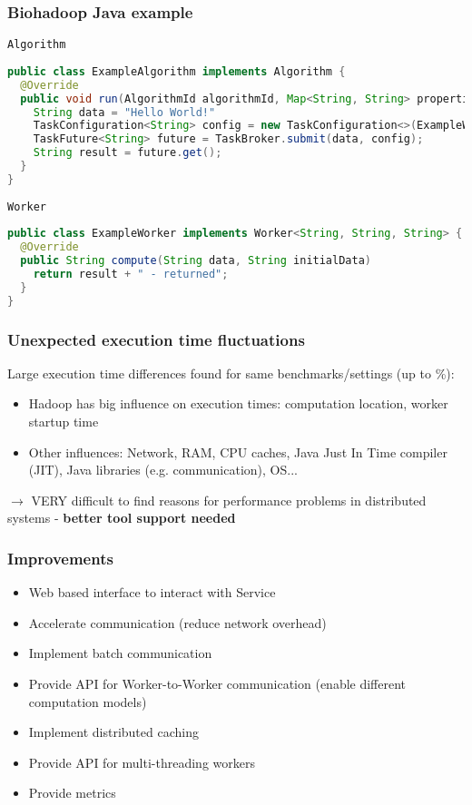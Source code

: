 \begin{frame}[fragile]
  \frametitle{Biohadoop Java example}
  \texttt{Algorithm}
  \begin{lstlisting}[language=java,basicstyle=\tiny\ttfamily,breaklines=true,keywordstyle=\color{blue},stringstyle=\color{black},showstringspaces=false,frame=single]
public class ExampleAlgorithm implements Algorithm {
  @Override
  public void run(AlgorithmId algorithmId, Map<String, String> properties)
    String data = "Hello World!"
    TaskConfiguration<String> config = new TaskConfiguration<>(ExampleWorker.class, null);
    TaskFuture<String> future = TaskBroker.submit(data, config);
    String result = future.get();
  }
}
  \end{lstlisting}

  \texttt{Worker}
  \begin{lstlisting}[language=java,basicstyle=\tiny\ttfamily,breaklines=true,keywordstyle=\color{blue},stringstyle=\color{black},showstringspaces=false,frame=single]
public class ExampleWorker implements Worker<String, String, String> {
  @Override
  public String compute(String data, String initialData)
    return result + " - returned";
  }
}
  \end{lstlisting}
\end{frame}

\begin{frame}
  \frametitle{Unexpected execution time fluctuations}
  Large execution time differences found for same benchmarks/settings (up to \unit[50]{\%}):
  \begin{itemize}
    \item Hadoop has big influence on execution times: computation location, worker startup time
    \item Other influences: Network, RAM, CPU caches, Java Just In Time compiler (JIT), Java libraries (e.g. communication), OS...
  \end{itemize}
  \vspace{1em}
  $\rightarrow$ VERY difficult to find reasons for performance problems in distributed systems - \textbf{better tool support needed}
\end{frame}

\begin{frame}
  \frametitle{Improvements}
  \begin{itemize}
    \item Web based interface to interact with Service
    \item Accelerate communication (reduce network overhead)
    \item Implement batch communication
    \item Provide API for Worker-to-Worker communication (enable different computation models)
    \item Implement distributed caching
    \item Provide API for multi-threading workers
    \item Provide metrics
  \end{itemize}
\end{frame}


